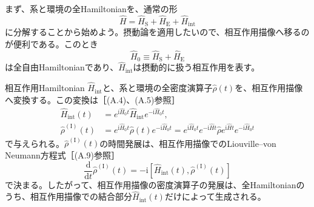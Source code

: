 まず、系と環境の全Hamiltonianを、通常の形
\begin{equation}
\hat H=\hat H_{\mathrm S}+\hat H_{\mathrm E}+\hat H_{\mathrm{int}}
\tag{4.12}
\end{equation}
に分解することから始めよう。摂動論を適用したいので、相互作用描像へ移るのが便利である。このとき
\begin{equation}
\hat H_0\equiv\hat H_{\mathrm S}+\hat H_{\mathrm E}
\tag{4.13}
\end{equation}
は全自由Hamiltonianであり、$\hat H_{\mathrm{int}}$は摂動的に扱う相互作用を表す。

相互作用Hamiltonian $\hat H_{\mathrm{int}}$と、系と環境の全密度演算子$\hat\rho(t)$を、相互作用描像へ変換する。この変換は［(A.4)、(A.5)参照］
\begin{align}
\hat H_{\mathrm{int}}(t)&=e^{\mathrm i\hat H_0t}\hat H_{\mathrm{int}}e^{-\mathrm i\hat H_0t},\tag{4.14}\\
\hat\rho^{(\mathrm I)}(t)&=e^{\mathrm i\hat H_0t}\hat\rho(t)e^{-\mathrm i\hat H_0t}
=e^{\mathrm i\hat H_0t}e^{-\mathrm i\hat Ht}\hat\rho e^{\mathrm i\hat Ht}e^{-\mathrm i\hat H_0t}\tag{4.15}
\end{align}
で与えられる。$\hat\rho^{(\mathrm I)}(t)$の時間発展は、相互作用描像でのLiouville--von Neumann方程式［(A.9)参照］
\begin{equation}
\frac{\mathrm d}{\mathrm dt}\hat\rho^{(\mathrm I)}(t)=-\mathrm i[\hat H_{\mathrm{int}}(t),\hat\rho^{(\mathrm I)}(t)]
\tag{4.16}
\end{equation}
で決まる。したがって、相互作用描像の密度演算子の発展は、全Hamiltonianのうち、相互作用描像での結合部分$\hat H_{\mathrm{int}}(t)$だけによって生成される。

